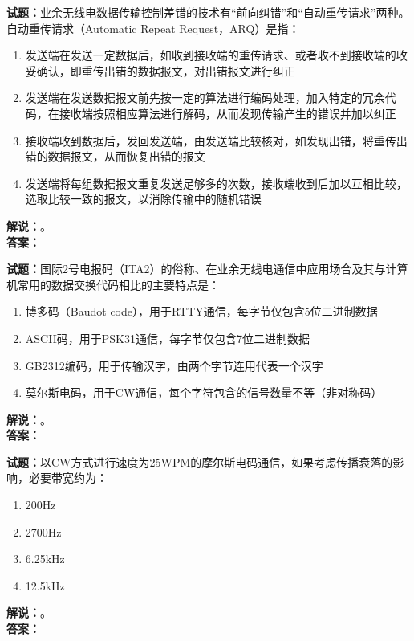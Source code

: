 \documentclass{ctexbook}
\begin{document}
\bigskip




\noindent\textbf{试题：}业余无线电数据传输控制差错的技术有“前向纠错”和“自动重传请求”两种。自动重传请求（Automatic Repeat Request，ARQ）是指：
\begin{enumerate}[leftmargin=3em]
\item 发送端在发送一定数据后，如收到接收端的重传请求、或者收不到接收端的收妥确认，即重传出错的数据报文，对出错报文进行纠正
\item 发送端在发送数据报文前先按一定的算法进行编码处理，加入特定的冗余代码，在接收端按照相应算法进行解码，从而发现传输产生的错误并加以纠正
\item 接收端收到数据后，发回发送端，由发送端比较核对，如发现出错，将重传出错的数据报文，从而恢复出错的报文
\item 发送端将每组数据报文重复发送足够多的次数，接收端收到后加以互相比较，选取比较一致的报文，以消除传输中的随机错误
\end{enumerate}
\noindent\textbf{解说：}\textbf{}。\\\noindent\textbf{答案：}

\bigskip




\noindent\textbf{试题：}国际2号电报码（ITA2）的俗称、在业余无线电通信中应用场合及其与计算机常用的数据交换代码相比的主要特点是：
\begin{enumerate}[leftmargin=3em]
\item 博多码（Baudot code），用于RTTY通信，每字节仅包含5位二进制数据
\item ASCII码，用于PSK31通信，每字节仅包含7位二进制数据
\item GB2312编码，用于传输汉字，由两个字节连用代表一个汉字
\item 莫尔斯电码，用于CW通信，每个字符包含的信号数量不等（非对称码）
\end{enumerate}
\noindent\textbf{解说：}\textbf{}。\\\noindent\textbf{答案：}

\bigskip




\noindent\textbf{试题：}以CW方式进行速度为25WPM的摩尔斯电码通信，如果考虑传播衰落的影响，必要带宽约为：
\begin{enumerate}[leftmargin=3em]
\item 200Hz 
\item 2700Hz
\item 6.25\unit{\kHz}
\item 12.5\unit{\kHz}
\end{enumerate}
\noindent\textbf{解说：}\textbf{}。\\\noindent\textbf{答案：}
\end{document}
